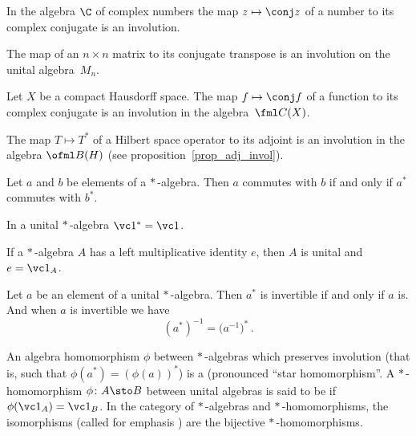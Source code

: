 \begin{exam} In the algebra $\C$ of complex numbers the map $z \mapsto \conj z$ of a
number to its complex conjugate is an involution.
\end{exam}

\begin{exam}\label{0010902} The map of an $n \times n$ matrix to its conjugate transpose
is an involution on the unital algebra~$M_n$.
\end{exam}

\begin{exam} Let $X$ be a compact Hausdorff space.  The map $f \mapsto \conj f$ of a
function to its complex conjugate is an involution in the algebra~$\fml C(X)$.
\end{exam}

\begin{exam} The map $T \mapsto T^*$ of a Hilbert space operator to its adjoint is an
involution in the algebra $\ofml B(H)$ (see proposition~\ref{prop_adj_invol}).
\end{exam}

\begin{prop} Let $a$ and $b$ be elements of a $*\,$-algebra.  Then $a$ commutes with $b$
if and only if $a^*$ commutes with $b^*$.
\end{prop}

\begin{prop} In a unital $*\,$-algebra $\vc 1^* = \vc 1$.
\end{prop}

\begin{prop}\label{00109125} If a $*\,$-algebra $A$ has a left multiplicative identity $e$,
then $A$ is unital and $e = \vc 1_A$.
\end{prop}

\begin{prop}\label{00109128fa} Let $a$ be an element of a unital $*\,$-algebra.  Then $a^*$ is invertible if and only if $a$ is.
And when $a$ is invertible we have
   \[ (a^*)^{-1} = \bigl(a^{-1}\bigr)^*\,. \]
\end{prop}

\begin{defn} An algebra homomorphism $\phi$ between $*\,$-algebras which preserves
involution (that is, such that $\phi(a^*) = (\phi(a))^*$) is a
 (pronounced ``star homomorphism''.  A $*\,$-homomorphism $\phi\colon A \sto B$ between unital algebras is said to be
 if $\phi(\vc 1_A) = \vc 1_B$.  In the category of $*\,$-algebras and $*\,$-homomorphisms, the isomorphisms (called for emphasis
) are the bijective $*\,$-homomorphisms.
\end{defn}

